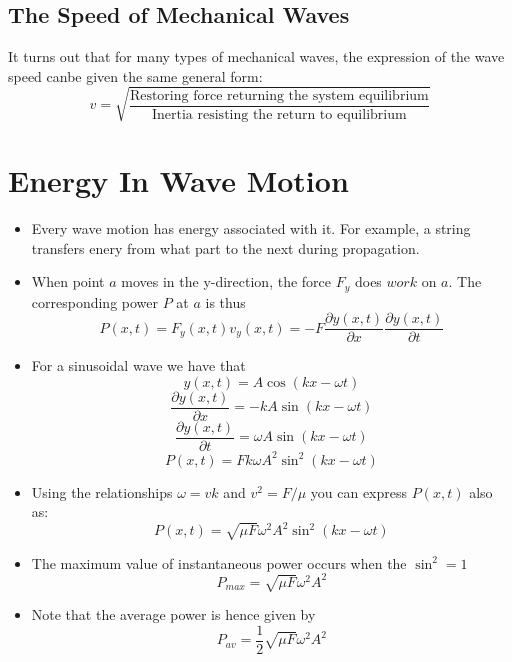\documentclass[11pt, a4paper]{article}
\begin{document}
\subsection{The Speed of Mechanical Waves}
It turns out that for many types of mechanical waves, the expression of the wave speed canbe given
the same general form:
\begin{equation}
    v = \sqrt{\frac{\text{Restoring force returning the system equilibrium}}
    {\text{Inertia resisting the return to equilibrium}}}
\end{equation}

\section[15.5, Energy In Wave Motion]{Energy In Wave Motion}

\begin{itemize}
    \item Every wave motion has energy associated with it. For example, a string transfers enery
        from what part to the next during propagation.
    \item When point $a$ moves in the y-direction, the force $F_y$ does $work$ on $a$. The corresponding
        power $P$ at $a$ is thus
        \begin{equation}
            P(x,t) = F_{y}(x,t)v_{y}(x,t) = -F\frac{\partial y(x,t)}{\partial x}
            \frac{\partial y(x,t)}{\partial t}
        \end{equation}
    \item For a sinusoidal wave we have that
        \begin{equation}
            y(x,t) = A\cos(kx - \omega t)
        \end{equation}
        \begin{equation}
            \frac{\partial y(x,t)}{\partial x} = -kA\sin(kx -\omega t)
        \end{equation}
        \begin{equation}
            \frac{\partial y(x,t)}{\partial t} = \omega A\sin(kx -\omega t)
        \end{equation}
        \begin{equation}
            P(x,t) =  Fk\omega A^{2}\sin^{2}(kx -\omega t)
        \end{equation}
    \item Using the relationships $\omega = vk$ and $v^2 = F/\mu$ you can express $P(x,t)$ also as:
        \begin{equation}
            P(x,t) = \sqrt{\mu F}\omega^{2}A^{2}\sin^{2}(kx - \omega t)
        \end{equation}
    \item The maximum value of instantaneous power occurs when the $\sin^2 = 1$
        \begin{equation}
            P_{max} = \sqrt{\mu F}\omega^{2}A^{2}
        \end{equation}
    \item Note that the average power is hence given by
        \begin{equation}
            P_{av} = \frac{1}{2}\sqrt{\mu F}\omega^{2}A^{2}
        \end{equation}
\end{itemize}
\end{document}
